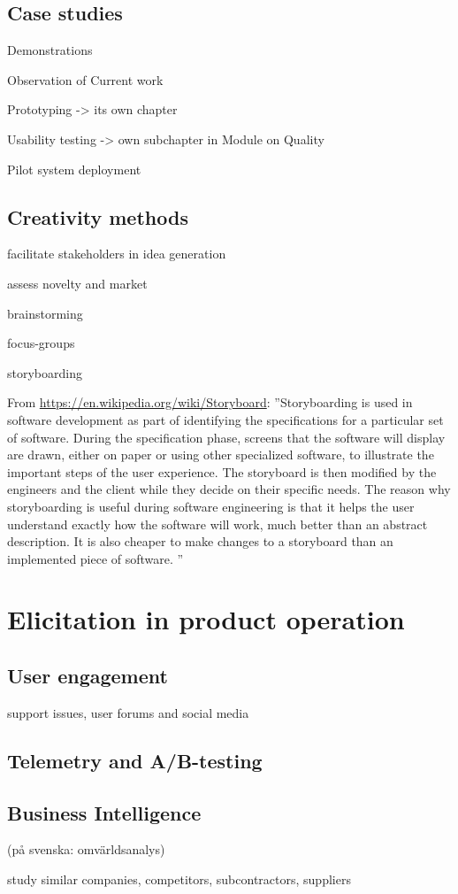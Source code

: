 \subsection{Case studies}

Demonstrations

Observation of Current work 

Prototyping -> its own chapter 

Usability testing -> own subchapter in Module on Quality

Pilot system deployment

\subsection{Creativity methods}

facilitate stakeholders in idea generation 

assess novelty and market 

brainstorming

focus-groups

storyboarding

From \url{https://en.wikipedia.org/wiki/Storyboard}:
''Storyboarding is used in software development as part of identifying the specifications for a particular set of software. During the specification phase, screens that the software will display are drawn, either on paper or using other specialized software, to illustrate the important steps of the user experience. The storyboard is then modified by the engineers and the client while they decide on their specific needs. The reason why storyboarding is useful during software engineering is that it helps the user understand exactly how the software will work, much better than an abstract description. It is also cheaper to make changes to a storyboard than an implemented piece of software. ''



\section{Elicitation in product operation}

\subsection{User engagement}
support issues, user forums and social media

\subsection{Telemetry and A/B-testing}

\subsection{Business Intelligence}
(på svenska: omvärldsanalys)

study similar companies, competitors, subcontractors, suppliers 

